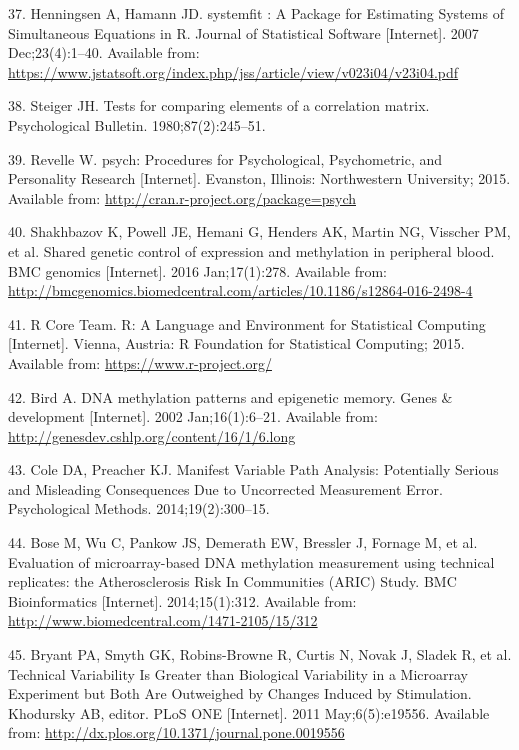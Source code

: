 \documentclass[]{article}
\begin{document}
\hypertarget{ref-Henningsen2007}{}
37. Henningsen A, Hamann JD. systemfit : A Package for Estimating
Systems of Simultaneous Equations in R. Journal of Statistical Software
{[}Internet{]}. 2007 Dec;23(4):1--40. Available from:
\url{https://www.jstatsoft.org/index.php/jss/article/view/v023i04/v23i04.pdf}

\hypertarget{ref-Steiger1980}{}
38. Steiger JH. Tests for comparing elements of a correlation matrix.
Psychological Bulletin. 1980;87(2):245--51.

\hypertarget{ref-Revelle2015}{}
39. Revelle W. psych: Procedures for Psychological, Psychometric, and
Personality Research {[}Internet{]}. Evanston, Illinois: Northwestern
University; 2015. Available from:
\url{http://cran.r-project.org/package=psych}

\hypertarget{ref-Shakhbazov2016}{}
40. Shakhbazov K, Powell JE, Hemani G, Henders AK, Martin NG, Visscher
PM, et al. Shared genetic control of expression and methylation in
peripheral blood. BMC genomics {[}Internet{]}. 2016 Jan;17(1):278.
Available from:
\url{http://bmcgenomics.biomedcentral.com/articles/10.1186/s12864-016-2498-4}

\hypertarget{ref-RCoreTeam2015}{}
41. R Core Team. R: A Language and Environment for Statistical Computing
{[}Internet{]}. Vienna, Austria: R Foundation for Statistical Computing;
2015. Available from: \url{https://www.r-project.org/}

\hypertarget{ref-Bird2002}{}
42. Bird A. DNA methylation patterns and epigenetic memory. Genes \&
development {[}Internet{]}. 2002 Jan;16(1):6--21. Available from:
\url{http://genesdev.cshlp.org/content/16/1/6.long}

\hypertarget{ref-Cole2014}{}
43. Cole DA, Preacher KJ. Manifest Variable Path Analysis: Potentially
Serious and Misleading Consequences Due to Uncorrected Measurement
Error. Psychological Methods. 2014;19(2):300--15.

\hypertarget{ref-Bose2014}{}
44. Bose M, Wu C, Pankow JS, Demerath EW, Bressler J, Fornage M, et al.
Evaluation of microarray-based DNA methylation measurement using
technical replicates: the Atherosclerosis Risk In Communities (ARIC)
Study. BMC Bioinformatics {[}Internet{]}. 2014;15(1):312. Available
from: \url{http://www.biomedcentral.com/1471-2105/15/312}

\hypertarget{ref-Bryant2011}{}
45. Bryant PA, Smyth GK, Robins-Browne R, Curtis N, Novak J, Sladek R,
et al. Technical Variability Is Greater than Biological Variability in a
Microarray Experiment but Both Are Outweighed by Changes Induced by
Stimulation. Khodursky AB, editor. PLoS ONE {[}Internet{]}. 2011
May;6(5):e19556. Available from:
\url{http://dx.plos.org/10.1371/journal.pone.0019556}
\end{document}
